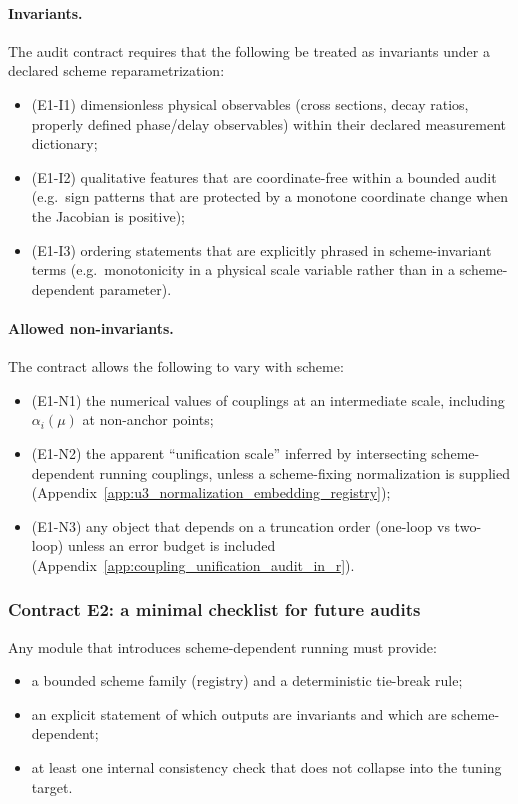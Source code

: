 \paragraph{Invariants.}
\AuditTag The audit contract requires that the following be treated as invariants under a declared scheme reparametrization:
\begin{itemize}
\item (E1-I1) dimensionless physical observables (cross sections, decay ratios, properly defined phase/delay observables) within their declared measurement dictionary;
\item (E1-I2) qualitative features that are coordinate-free within a bounded audit (e.g.\ sign patterns that are protected by a monotone coordinate change when the Jacobian is positive);
\item (E1-I3) ordering statements that are explicitly phrased in scheme-invariant terms (e.g.\ monotonicity in a physical scale variable rather than in a scheme-dependent parameter).
\end{itemize}

\paragraph{Allowed non-invariants.}
\AuditTag The contract allows the following to vary with scheme:
\begin{itemize}
\item (E1-N1) the numerical values of couplings at an intermediate scale, including $\alpha_i(\mu)$ at non-anchor points;
\item (E1-N2) the apparent ``unification scale'' inferred by intersecting scheme-dependent running couplings, unless a scheme-fixing normalization is supplied (Appendix~\ref{app:u3_normalization_embedding_registry});
\item (E1-N3) any object that depends on a truncation order (one-loop vs two-loop) unless an error budget is included (Appendix~\ref{app:coupling_unification_audit_in_r}).
\end{itemize}

\subsubsection{Contract E2: a minimal checklist for future audits}
\AuditTag Any module that introduces scheme-dependent running must provide:
\begin{itemize}
\item a bounded scheme family (registry) and a deterministic tie-break rule;
\item an explicit statement of which outputs are invariants and which are scheme-dependent;
\item at least one internal consistency check that does not collapse into the tuning target.
\end{itemize}

